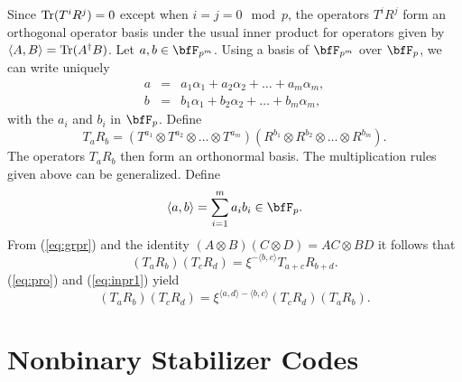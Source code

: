 \documentclass{article}
\def\Tr{\qopname\relax{no}{Tr}}
\begin{document}
Since $\Tr(T^iR^j)=0$ except when $i=j=0\mod p$, the operators
$T^iR^j$ form an orthogonal operator basis under the usual inner
product for operators given by $\langle A,B\rangle = \Tr(A^\dagger B)$.
Let $a,b\in \bfF_{p^m}$. Using a basis of $\bfF_{p^m}$ over
$\bfF_{p}$, we can write uniquely
\begin{eqnarray*}
a& = &a_1\alpha_1+a_2\alpha_2+\ldots +a_m\alpha_m, \\
b& = &b_1\alpha_1+b_2\alpha_2+\ldots +b_m\alpha_m,
\end{eqnarray*}
with the $a_i$ and $b_i$ in $\bfF_p$. Define
$$
T_aR_b=(T^{a_1}\otimes T^{a_2} \otimes\ldots    \otimes T^{a_m})
 (R^{b_1}\otimes R^{b_2}  \otimes\ldots    \otimes R^{b_m}).
$$
The operators $T_aR_b$ then form an orthonormal basis. 
The multiplication rules given above can be generalized.
Define 
\begin{equation}\label{eq:inpr1}
\langle a,b\rangle=\sum_{i=1}^m a_ib_i \in \bfF_p.
\end{equation}
From (\ref{eq:grpr}) and the identity $(A\otimes
B)(C\otimes D)=AC\otimes BD$ it follows that 
\begin{equation}\label{eq:grpr:ten}
 (T_aR_b)(T_cR_d)=\xi^{-\langle b,c\rangle}T_{a+c}R_{b+d}.
\end{equation} 
(\ref{eq:pro}) and (\ref{eq:inpr1}) yield
\begin{equation}\label{eq:prod:ten}
 (T_aR_b)(T_cR_d)=\xi^{\langle a,d\rangle-\langle b,c\rangle}(T_cR_d)(T_aR_b). 
\end{equation}

\section{Nonbinary Stabilizer Codes}
\end{document}
